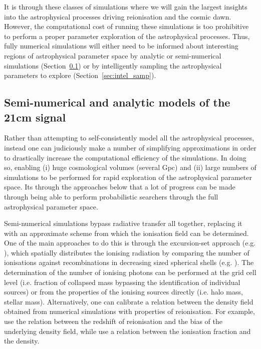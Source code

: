 It is through these classes of simulations where we will gain the largest insights into the astrophysical processes driving reionisation and the cosmic dawn. However, the computational cost of running these simulations is too prohibitive to perform a proper parameter exploration of the astrophysical processes. Thus, fully numerical simulations will either need to be informed about interesting regions of astrophysical parameter space by analytic or semi-numerical simulations (Section~\ref{sec:efficientsims}) or by intelligently sampling the astrophysical parameters to explore (Section~\ref{sec:intel_samp}).

\subsection{Semi-numerical and analytic models of the 21cm signal} \label{sec:efficientsims}

Rather than attempting to self-consistently model all the astrophysical processes, instead one can judiciously make a number of simplifying approximations in order to drastically increase the computational efficiency of the simulations. In doing so, enabling (i) huge cosmological volumes (several Gpc) and (ii) large numbers of simulations to be performed for rapid exploration of the astrophysical parameter space. Its through the approaches below that a lot of progress can be made through being able to perform probabilistic searchers through the full astrophysical parameter space.

Semi-numerical simulations bypass radiative transfer all together, replacing it with an approximate scheme from which the ionisation field can be determined. One of the main approaches to do this is through the excursion-set approach (e.g. \cite{Furlanetto:2004}), which spatially distributes the ionising radiation by comparing the number of ionisations against recombinations in decreasing sized spherical shells (e.g. \cite{Mesinger:2007,Zahn:2007,Geil:2008,Alvarez:2009,Santos:2010,Mesinger:2011,Visbal:2012,Kim:2013,Fialkov:2014,Majumdar:2014,Choudhury:2015,Hassan:2016,Kulkarni:2016,Mutch:2016,Hutter:2018b,Park:2019}). The determination of the number of ionising photons can be performed at the grid cell level (i.e. fraction of collapsed mass bypassing the identification of individual sources) or from the properties of the ionising sources directly (i.e. halo mass, stellar mass). Alternatively, one can calibrate a relation between the density field obtained from numerical simulations with properties of reionisation. For example, \cite{Battaglia:2013} use the relation between the redshift of reionisation and the bias of the underlying density field, while \cite{Kim:2016} use a relation between the ionisation fraction and the density.

